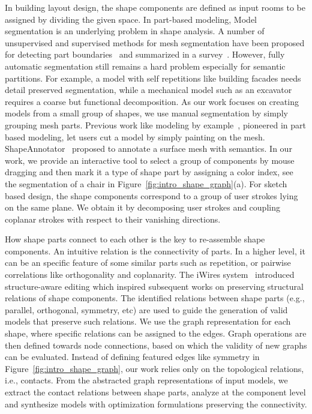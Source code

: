 %
In building layout design, the shape components are defined as input rooms to be assigned by dividing the given space. In part-based modeling, Model segmentation is an underlying problem in shape analysis. A number of unsupervised and supervised methods for mesh segmentation have been proposed for detecting part boundaries~\cite{Sidi11,Wang12} and summarized in a survey~\cite{shamir2008survey}. However, fully automatic segmentation still remains a hard problem especially for semantic partitions. For example, a model with self repetitions like building facades needs detail preserved segmentation, while a mechanical model such as an excavator requires a coarse but functional decomposition. As our work focuses on creating models from a small group of shapes, we use manual segmentation by simply grouping mesh parts. Previous work like modeling by example~\cite{Funkhouser2004}, pioneered in part based modeling, let users cut a model by simply painting on the mesh. ShapeAnnotator~\cite{attene:09} proposed to annotate a surface mesh with semantics. In our work, we provide an interactive tool to select a group of components by mouse dragging and then mark it a type of shape part by assigning a color index, see the segmentation of a chair in Figure~\ref{fig:intro_shape_graph}(a). For sketch based design, the shape components correspond to a group of user strokes lying on the same plane. We obtain it by decomposing user strokes and coupling coplanar strokes with respect to their vanishing directions.

%
How shape parts connect to each other is the key to re-assemble shape components. An intuitive relation is the connectivity of parts. In a higher level, it can be an specific feature of some similar parts such as repetition, or pairwise correlations like orthogonality and coplanarity. The iWires system~\cite{Gal2009} introduced structure-aware editing which inspired subsequent works on preserving structural relations of shape components. The identified relations between shape parts (e.g., parallel, orthogonal, symmetry, etc) are used to guide the generation of valid models that preserve such relations. We use the graph representation for each shape, where specific relations can be assigned to the edges. Graph operations are then defined towards node connections, based on which the validity of new graphs can be evaluated. Instead of defining featured edges like symmetry in Figure~\ref{fig:intro_shape_graph}, our work relies only on the topological relations, i.e., contacts. From the abstracted graph representations of input models, we extract the contact relations between shape parts, analyze at the component level and synthesize models with optimization formulations preserving the connectivity.

